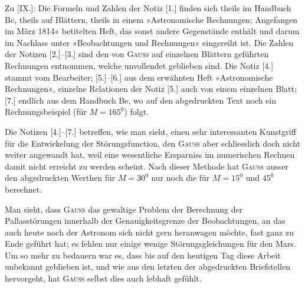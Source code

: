 \par\noindent\hspace*{\parindent}Zu [IX.]: Die Formeln und Zahlen der Notiz [1.] finden sich theils im
Handbuch Bc, theils auf Blättern, theils in einem »Astronomische Rechnungen;
Angefangen im März 1814« betitelten Heft, das sonst andere Gegenstände enthält
und darum im Nachlass unter »Beobachtungen und Rechnungen« eingereiht ist.
Die Zahlen der Notizen [2.]--[3.] sind den von \textsc{Gauss} auf einzelnen Blättern
geführten Rechnungen entnommen, welche unvollendet geblieben sind. Die Notiz [4.]
stammt vom Bearbeiter; [5.]--[6.] aus dem erwähnten Heft »Astronomische Rechnungen«,
einzelne Relationen der Notiz [5.] auch von einem einzelnen Blatt; [7.] endlich
aus dem Handbuch Be, wo auf den abgedruckten Text noch ein Rechnungsbeispiel
(für \(M=165^0\)) folgt.

\par\noindent\hspace*{\parindent}Die Notizen [4.]--[7.] betreffen, wie man sieht, einen sehr interessanten
Kunstgriff für die Entwickelung der Störungsfunction, den \textsc{Gauss} aber
schliesslich doch nicht weiter angewandt hat, weil eine wesentliche Ersparniss
im numerischen Rechnen damit nicht erreicht zu werden scheint. Nach dieser
Methode hat \textsc{Gauss} ausser den abgedruckten Werthen für \(M=30^0\) nur noch
die für \(M=15^0\) und \(45^0\) berechnet.

\medskip
\par\noindent\hspace*{\parindent}Man sieht, dass \textsc{Gauss} das gewaltige Problem der Berechnung der
Pallasstörungen innerhalb der Genauigkeitsgrenze der Beobachtungen, an das auch
heute noch der Astronom sich nicht gern heranwagen möchte, fast ganz zu Ende
geführt hat; es fehlen nur einige wenige Störungsgleichungen für den Mars.
Um so mehr zu bedauern war es, dass bis auf den heutigen Tag diese Arbeit
unbekannt geblieben ist, und wie aus den letzten der abgedruckten Briefstellen
hervorgeht, hat \textsc{Gauss} selbst dies auch lebhaft gefühlt.

